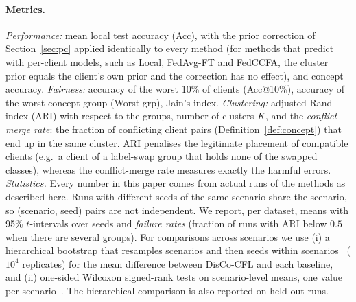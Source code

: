 \paragraph{Metrics.} \emph{Performance:} mean local test accuracy (Acc), with the prior correction of Section~\ref{sec:pc} applied identically to every method (for methods that predict with per-client models, such as Local, FedAvg-FT and FedCCFA, the cluster prior equals the client's own prior and the correction has no effect), and concept accuracy. \emph{Fairness:} accuracy of the worst 10\% of clients (Acc@10\%), accuracy of the worst concept group (Worst-grp), Jain's index. \emph{Clustering:} adjusted Rand index (ARI) with respect to the groups, number of clusters $K$, and the \emph{conflict-merge rate}: the fraction of conflicting client pairs (Definition~\ref{def:concept}) that end up in the same cluster. ARI penalises the legitimate placement of compatible clients (e.g.\ a client of a label-swap group that holds none of the swapped classes), whereas the conflict-merge rate measures exactly the harmful errors. \emph{Statistics.} Every number in this paper comes from actual runs of the methods as described here. Runs with different seeds of the same scenario share the scenario, so (scenario, seed) pairs are not independent. We report, per dataset, means with 95\% $t$-intervals over seeds and \emph{failure rates} (fraction of runs with ARI below $0.5$ when there are several groups). For comparisons across scenarios we use (i) a hierarchical bootstrap that resamples scenarios and then seeds within scenarios~\citep{saravanan2020hierarchical} ($10^4$ replicates) for the mean difference between DisCo-CFL and each baseline, and (ii) one-sided Wilcoxon signed-rank tests on scenario-level means, one value per scenario~\citep{demsar2006statistical}. The hierarchical comparison is also reported on held-out runs.
